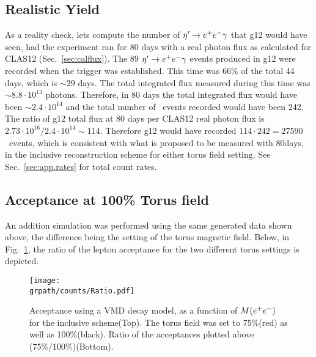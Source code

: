 \subsection{Realistic Yield}
As a reality check, lets compute the number of $\eta^{\prime} \to e^+e^- \gamma$ that g12 would have seen, had the experiment ran for 80 days with a real photon flux as calculated for CLAS12 (Sec.~\ref{sec:calflux}). %
The 89 $\eta^{\prime} \to e^+e^- \gamma$ events produced in g12 were recorded when the \epemT trigger was established. This time was 66\% of the total 44 days, which is $\sim29$ days. The total integrated flux measured during this time was $\sim 8.8\cdot 10^{13}$ photons. Therefore, in 80 days the total integrated flux would have been $\sim 2.4\cdot 10^{14}$ and the total number of \etaPDal \ events recorded would have been 242. The ratio of g12 total flux at 80 days per CLAS12 real photon flux is $2.73\cdot 10^{16} / 2.4\cdot 10^{14} \sim 114 $. Therefore g12 would have recorded $114\cdot 242 = 27590$ \etaPDal \ events, which is consistent with what is proposed to be measured with 80days, in the inclusive reconstruction scheme for either torus field setting. See Sec.~\ref{sec:app.rates} for total count rates.
\subsection{Acceptance at 100\% Torus field}
An addition simulation was performed using the same generated data shown above, the difference being the setting of the torus magnetic field. Below, in Fig.~\ref{fig:ratio}, the ratio of the lepton acceptance for the two different torus settings is depicted.
\begin{figure}[h!]\begin{center}
 		\texttt{[image: \\grpath/counts/Ratio.pdf]}
 		\caption[Acceptance, as a function of $M(\epem)$]{\label{fig:ratio}{Acceptance using a VMD decay model, as a function of $M(\epem)$ for the inclusive scheme(Top). The torus field was set to 75\%(red) as well as 100\%(black). Ratio of the acceptances plotted above (75\%/100\%)(Bottom). }}
\end{center}\end{figure}
